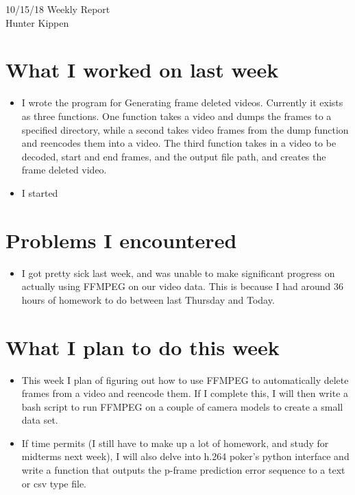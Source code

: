 \documentclass[12pt]{article}%
\def\bi{\begin{itemize}     %
\vspace{-0.5em}\setlength\itemsep{0em}}
\begin{document}
\begin{center}
{\LARGE 10/15/18 Weekly Report}\\
\vspace{0.5em}
{\Large Hunter Kippen}
\vspace{0.5em}
\end{center}


\section{What I worked on last week}
\bi
\item I wrote the program for Generating frame deleted videos. Currently it exists as three functions. One function takes a video and dumps the frames to a specified directory, while a second takes video frames from the dump function and reencodes them into a video. The third function takes in a video to be decoded, start and end frames, and the output file path, and creates the frame deleted video.
\item I started 
\end{itemize}


\section{Problems I encountered}
\bi
\item I got pretty sick last week, and was unable to make significant progress on actually using FFMPEG on our video data. This is because I had around 36 hours of homework to do between last Thursday and Today. 
\end{itemize}

\section{What I plan to do this week}
\bi
\item This week I plan of figuring out how to use FFMPEG to automatically delete frames from a video and reencode them. If I complete this, I will then write a bash script to run FFMPEG on a couple of camera models to create a small data set.
\item If time permits (I still have to make up a lot of homework, and study for midterms next week), I will also delve into h.264 poker's python interface and write a function that outputs the p-frame prediction error sequence to a text or csv type file.
\end{itemize}





\begin{comment}
\pagebreak
%


%
\end{comment}
\end{document}
